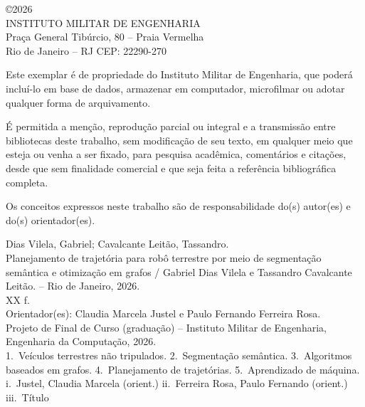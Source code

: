 \documentclass[
    12pt,
    openright,
    oneside,
    a4paper,
    english,
    brazil
]{abntex2}
\begin{document}
\begin{fichacatalografica}
    \vspace*{\fill}
    \begin{center}
    {\normalsize \copyright 2026\\
    INSTITUTO MILITAR DE ENGENHARIA\\
    Praça General Tibúrcio, 80 -- Praia Vermelha\\
    Rio de Janeiro -- RJ CEP: 22290-270}
    \end{center}

    \vspace{1cm}

    \noindent Este exemplar é de propriedade do Instituto Militar de Engenharia, que poderá incluí-lo em base de dados, armazenar em computador, microfilmar ou adotar qualquer forma de arquivamento.

    É permitida a menção, reprodução parcial ou integral e a transmissão entre bibliotecas deste trabalho, sem modificação de seu texto, em qualquer meio que esteja ou venha a ser fixado, para pesquisa acadêmica, comentários e citações, desde que sem finalidade comercial e que seja feita a referência bibliográfica completa.

    Os conceitos expressos neste trabalho são de responsabilidade do(s) autor(es) e do(s) orientador(es).

    \vspace{1cm}

    \noindent
    Dias Vilela, Gabriel; Cavalcante Leitão, Tassandro.\\
    Planejamento de trajetória para robô terrestre por meio de segmentação semântica e otimização em grafos / Gabriel Dias Vilela e Tassandro Cavalcante Leitão. -- Rio de Janeiro, 2026.\\
    XX f.\\[0.5em]
    Orientador(es): Claudia Marcela Justel e Paulo Fernando Ferreira Rosa.\\[0.5em]
    Projeto de Final de Curso (graduação) -- Instituto Militar de Engenharia, Engenharia da Computação, 2026.\\[0.5em]
    1.~Veículos terrestres não tripulados. 2.~Segmentação semântica. 3.~Algoritmos baseados em grafos. 4.~Planejamento de trajetórias. 5.~Aprendizado de máquina. i.~Justel, Claudia Marcela (orient.) ii.~Ferreira Rosa, Paulo Fernando (orient.) iii.~Título
    \vspace*{\fill}
\end{fichacatalografica}
\end{document}
